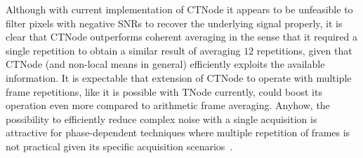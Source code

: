 Although with current implementation of CTNode it appears to be unfeasible to filter pixels with negative SNRs to recover the underlying signal properly, it is clear that CTNode outperforms coherent averaging in the sense that it required a single repetition to obtain a similar result of averaging $12$ repetitions, given that CTNode (and non-local means in general) efficiently exploits the available information. It is expectable that extension of CTNode to operate with multiple frame repetitions, like it is possible with TNode currently, could boost its operation even more compared to arithmetic frame averaging. Anyhow, the possibility to efficiently reduce complex noise with a single acquisition is attractive for phase-dependent techniques where multiple repetition of frames is not practical given its specific acquisition scenarios~\cite{Uribe-Patarroyo2020_Noise}.
